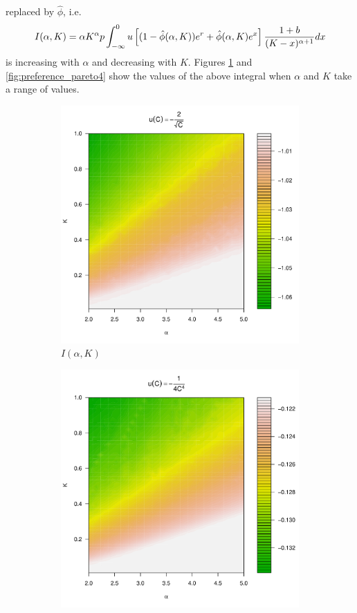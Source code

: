 \documentclass{article}
\begin{document}
replaced by $\hat\phi$, i.e.
\[
I(\alpha, K) = 
  \alpha K^\alpha  p
  \int_{-\infty}^0
  u\left[ (1 - \hat\phi(\alpha, K)) e^r + \hat\phi(\alpha, K) e^x \right]
  {1 + b \over (K - x)^{\alpha + 1}} dx
\]
is increasing with $\alpha$ and decreasing with $K$. Figures
\ref{fig:preference_pareto5e-1} and \ref{fig:preference_pareto4}
show the values of the above integral when $\alpha$ and $K$ take
a range of values.
\begin{figure}[htb!]
  \begin{subfigure}[b]{0.5\linewidth}
    \includegraphics[width=\textwidth]{preference_pareto5e-1.pdf}
    \caption{$I(\alpha, K)$}
    \label{fig:preference_pareto5e-1}
  \end{subfigure}
  \begin{subfigure}[b]{0.5\linewidth}
    \includegraphics[width=\textwidth]{preference_pareto4.pdf}

\end{subfigure}
\end{figure}
\end{document}
